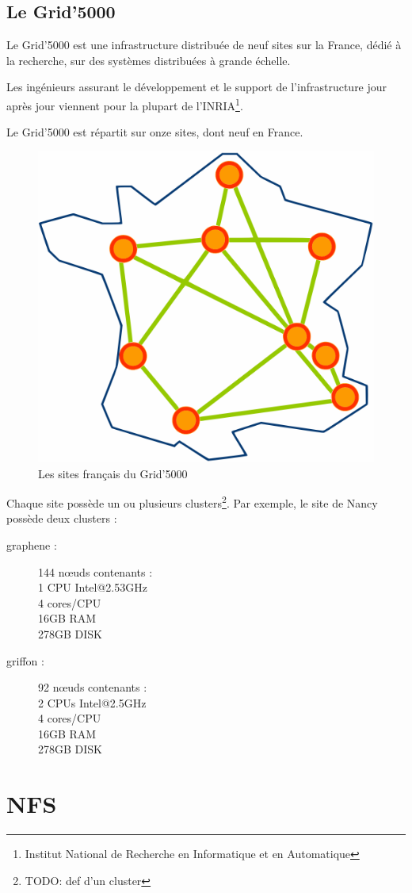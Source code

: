 \documentclass[12pt]{report}
\begin{document}
		\section{Le Grid'5000}
		Le Grid'5000 est une infrastructure distribuée de neuf sites sur la France, dédié à la recherche,
		sur des systèmes distribuées à grande échelle.

		Les ingénieurs assurant le développement et le support de l'infrastructure jour après jour viennent pour la plupart	de l'INRIA\footnote{Institut National de Recherche en Informatique et en Automatique}.

		Le Grid'5000 est répartit sur onze sites, dont neuf en France.

		\begin{figure}[H]
			\begin{center}
				\includegraphics[width=0.4\linewidth]{images/Site_map.png}
				\caption{Les sites français du Grid'5000}
			\end{center}
		\end{figure}

		Chaque site possède un ou plusieurs clusters\footnote{TODO: def d'un cluster}. Par exemple, le site de Nancy possède deux clusters :
		
		\begin{description}
			\item[graphene :] 144 nœuds contenants :\\
			1 CPU Intel@2.53GHz\\
			4 cores/CPU\\
			16GB RAM\\
			278GB DISK
			\item[griffon :] 92 nœuds contenants :\\
			2 CPUs Intel@2.5GHz\\
			4 cores/CPU\\
			16GB RAM\\
			278GB DISK
		\end{description}

	\chapter{NFS}
\end{document}
